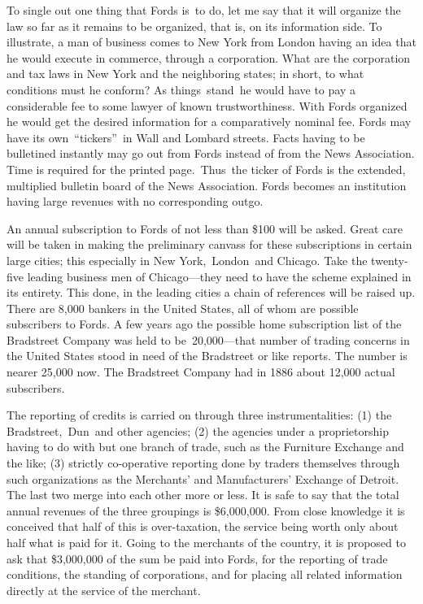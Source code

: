 \documentclass[twoside,symmetric,nobib,justified]{tufte-book}
\begin{document}
To single out one thing that Fords is~to do, let me say that it will
organize the law so far as it remains to be organized, that is, on its
information side. To illustrate, a man of business comes to New York
from London having an idea that he would execute in commerce, through a
corporation. What are the corporation and tax laws in New York and the
neighboring states; in short, to what conditions must he conform? As
things~stand~he would have to pay a considerable fee to some lawyer of
known trustworthiness. With Fords organized he would get the desired
information for a comparatively nominal fee. Fords may have its
own~``tickers''~in Wall and Lombard streets. Facts having to be
bulletined instantly may go out from Fords instead of from the News
Association. Time is required for the printed page.~Thus~the ticker of
Fords is the extended, multiplied bulletin board of the News
Association. Fords becomes an institution having large revenues with no
corresponding outgo.~

An annual subscription to Fords of not less than \$100 will be asked.
Great care will be taken in making the preliminary canvass for these
subscriptions in certain large cities; this especially in New
York,~London~and Chicago. Take the twenty-five leading business men of
Chicago---they need to have the scheme explained in its entirety. This
done, in the leading cities a chain of references will be raised up.
There are 8,000 bankers in the United States, all of whom are possible
subscribers to Fords. A few years ago the possible home subscription
list of the Bradstreet Company was held to be~20,000---that number of
trading concerns in the United States stood in need of the Bradstreet or
like reports. The number is nearer 25,000 now. The Bradstreet Company
had in 1886 about 12,000 actual subscribers.~

The reporting of credits is carried on through three instrumentalities:
(1) the Bradstreet,~Dun~and other agencies; (2) the agencies under a
proprietorship having to do with but one branch of trade, such as the
Furniture Exchange and the like; (3) strictly co-operative reporting
done by traders themselves through such organizations as the Merchants'
and Manufacturers' Exchange of Detroit. The last two merge into each
other more or less. It is safe to say that the total annual revenues of
the three groupings is \$6,000,000. From close knowledge it is conceived
that half of this is over-taxation, the service being worth only about
half what is paid for it. Going to the merchants of the country, it is
proposed to ask that \$3,000,000 of the sum be paid into Fords, for the
reporting of trade conditions, the standing of corporations, and for
placing all related information directly at the service of the
merchant.~
\end{document}
